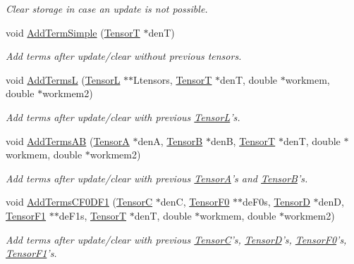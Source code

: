 \begin{DoxyCompactItemize}
\begin{DoxyCompactList}\small\item\em Clear storage in case an update is not possible. \end{DoxyCompactList}\item 
void \hyperlink{classCheMPS2_1_1TensorQ_a2713d322bf2d702d276cac8619196b0f}{Add\-Term\-Simple} (\hyperlink{classCheMPS2_1_1TensorT}{Tensor\-T} $\ast$den\-T)
\begin{DoxyCompactList}\small\item\em Add terms after update/clear without previous tensors. \end{DoxyCompactList}\item 
void \hyperlink{classCheMPS2_1_1TensorQ_a1aabed806e81453ed29f84626985bc65}{Add\-Terms\-L} (\hyperlink{classCheMPS2_1_1TensorL}{Tensor\-L} $\ast$$\ast$Ltensors, \hyperlink{classCheMPS2_1_1TensorT}{Tensor\-T} $\ast$den\-T, double $\ast$workmem, double $\ast$workmem2)
\begin{DoxyCompactList}\small\item\em Add terms after update/clear with previous \hyperlink{classCheMPS2_1_1TensorL}{Tensor\-L}'s. \end{DoxyCompactList}\item 
void \hyperlink{classCheMPS2_1_1TensorQ_acf51806ae9d447da34bcd0fb1d4ec814}{Add\-Terms\-A\-B} (\hyperlink{classCheMPS2_1_1TensorA}{Tensor\-A} $\ast$den\-A, \hyperlink{classCheMPS2_1_1TensorB}{Tensor\-B} $\ast$den\-B, \hyperlink{classCheMPS2_1_1TensorT}{Tensor\-T} $\ast$den\-T, double $\ast$workmem, double $\ast$workmem2)
\begin{DoxyCompactList}\small\item\em Add terms after update/clear with previous \hyperlink{classCheMPS2_1_1TensorA}{Tensor\-A}'s and \hyperlink{classCheMPS2_1_1TensorB}{Tensor\-B}'s. \end{DoxyCompactList}\item 
void \hyperlink{classCheMPS2_1_1TensorQ_a330b217d44dc4d318c8d7e01bb6789cc}{Add\-Terms\-C\-F0\-D\-F1} (\hyperlink{classCheMPS2_1_1TensorC}{Tensor\-C} $\ast$den\-C, \hyperlink{classCheMPS2_1_1TensorF0}{Tensor\-F0} $\ast$$\ast$de\-F0s, \hyperlink{classCheMPS2_1_1TensorD}{Tensor\-D} $\ast$den\-D, \hyperlink{classCheMPS2_1_1TensorF1}{Tensor\-F1} $\ast$$\ast$de\-F1s, \hyperlink{classCheMPS2_1_1TensorT}{Tensor\-T} $\ast$den\-T, double $\ast$workmem, double $\ast$workmem2)
\begin{DoxyCompactList}\small\item\em Add terms after update/clear with previous \hyperlink{classCheMPS2_1_1TensorC}{Tensor\-C}'s, \hyperlink{classCheMPS2_1_1TensorD}{Tensor\-D}'s, \hyperlink{classCheMPS2_1_1TensorF0}{Tensor\-F0}'s, \hyperlink{classCheMPS2_1_1TensorF1}{Tensor\-F1}'s. \end{DoxyCompactList}\end{DoxyCompactItemize}
